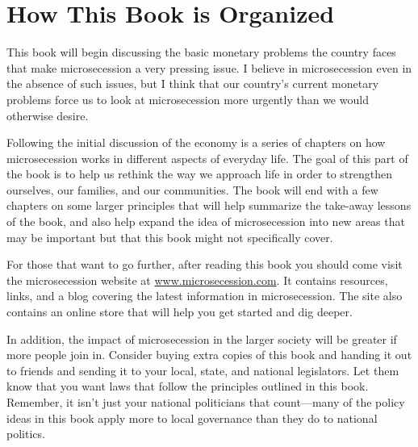 \section{How This Book is Organized}

This book will begin discussing the basic monetary problems the country
faces that make microsecession a very pressing issue. I believe in
microsecession even in the absence of such issues, but I think that
our country’s current monetary problems force us to look at
microsecession more urgently than we would otherwise desire. 

Following the initial discussion of the economy is a series of chapters
on how microsecession works in different aspects of everyday life. The
goal of this part of the book is to help us rethink the way we approach
life in order to strengthen ourselves, our families, and our
communities. The book will end with a few chapters on some larger
principles that will help summarize the take-away lessons of the book,
and also help expand the idea of microsecession into new areas
that may be important but that this book might not specifically cover.

\begin{infonote}
For those that want to go further, after reading this book you should come 
visit the microsecession website at \url{www.microsecession.com}.
It contains resources, links, and a blog covering the latest information
in microsecession.  The site also contains an online store that
will help you get started and dig deeper.

In addition, the impact of microsecession in the larger society will be greater if
more people join in.  Consider buying extra copies of this book
and handing it out to friends and sending it to your local, state,
and national legislators.  Let them know that you want laws
that follow the principles outlined in this book.  Remember, it
isn't just your national politicians that count---many of the policy
ideas in this book apply more to local governance than they do to 
national politics.
\end{infonote}
